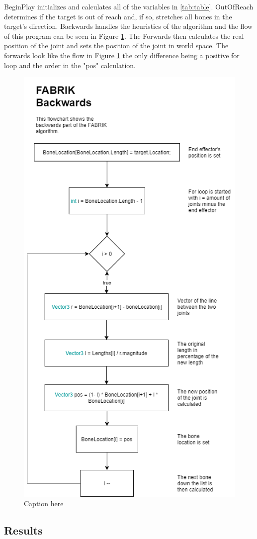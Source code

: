 BeginPlay initializes and calculates all of the variables in \autoref{tab:table}. OutOfReach determines if the target is out of reach and, if so, stretches all bones in the target's direction. 
Backwards handles the heuristics of the algorithm and the flow of this program can be seen in Figure \ref{fig:flow}. The Forwards then calculates the real position of the joint and sets the position of the joint in world space. The forwards look like the flow in Figure \ref{fig:flow} the only difference being a positive for loop and the order in the "pos" calculation.

\begin{figure}[hbtp]
\centering
\includegraphics[scale=1]{Flowchart.png}
\caption{Caption here}
\label{fig:flow}
\end{figure}

\subsection{Results}